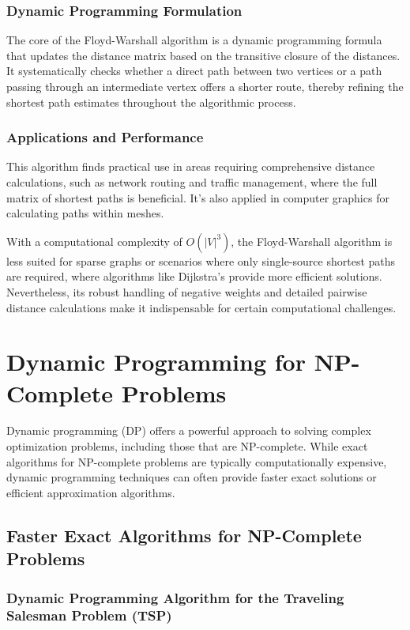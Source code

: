 \documentclass[12pt]{book} %
\begin{document}
\subsubsection{Dynamic Programming Formulation}

The core of the Floyd-Warshall algorithm is a dynamic programming formula that updates the distance matrix based on the transitive closure of the distances. It systematically checks whether a direct path between two vertices or a path passing through an intermediate vertex offers a shorter route, thereby refining the shortest path estimates throughout the algorithmic process.

\subsubsection{Applications and Performance}

This algorithm finds practical use in areas requiring comprehensive distance calculations, such as network routing and traffic management, where the full matrix of shortest paths is beneficial. It's also applied in computer graphics for calculating paths within meshes.

With a computational complexity of \(O(|V|^3)\), the Floyd-Warshall algorithm is less suited for sparse graphs or scenarios where only single-source shortest paths are required, where algorithms like Dijkstra's provide more efficient solutions. Nevertheless, its robust handling of negative weights and detailed pairwise distance calculations make it indispensable for certain computational challenges.


\section{Dynamic Programming for NP-Complete Problems}

Dynamic programming (DP) offers a powerful approach to solving complex optimization problems, including those that are NP-complete. While exact algorithms for NP-complete problems are typically computationally expensive, dynamic programming techniques can often provide faster exact solutions or efficient approximation algorithms.

\subsection{Faster Exact Algorithms for NP-Complete Problems}

\subsubsection{Dynamic Programming Algorithm for the Traveling Salesman Problem (TSP)}
\end{document}
